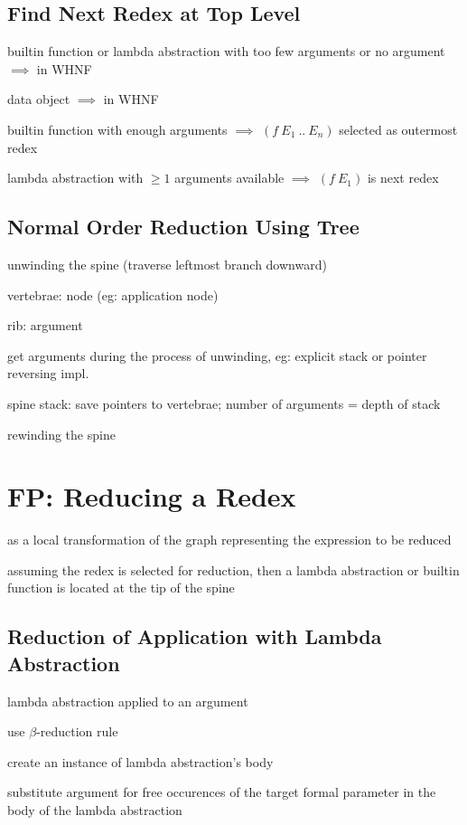 \documentclass[8pt]{extarticle}
\begin{document}
\begin{multicols*}{2}
\subsection{Find Next Redex at Top Level}
builtin function or lambda abstraction with too few arguments or no argument $\implies$ in WHNF

data object $\implies$ in WHNF

builtin function with enough arguments $\implies$ $(f\ E_1\ ..\ E_n)$ selected as outermost redex

lambda abstraction with $\geq 1$ arguments available $\implies$ $(f\ E_1)$ is next redex

\subsection{Normal Order Reduction Using Tree}
unwinding the spine (traverse leftmost branch downward)

vertebrae: node (eg: application node)

rib: argument

get arguments during the process of unwinding, eg: explicit stack or pointer reversing impl.

spine stack: save pointers to vertebrae; number of arguments = depth of stack

rewinding the spine

\vfill\null
\columnbreak

\section{FP: Reducing a Redex}

as a local transformation of the graph representing the expression to be reduced

assuming the redex is selected for reduction, then a lambda abstraction or builtin function is located at the tip of the spine

\subsection{Reduction of Application with Lambda Abstraction}

lambda abstraction applied to an argument

use $\beta$-reduction rule

create an instance of lambda abstraction's body

substitute argument for free occurences of the target formal parameter in the body of the lambda abstraction



\end{multicols*}
\end{document}

